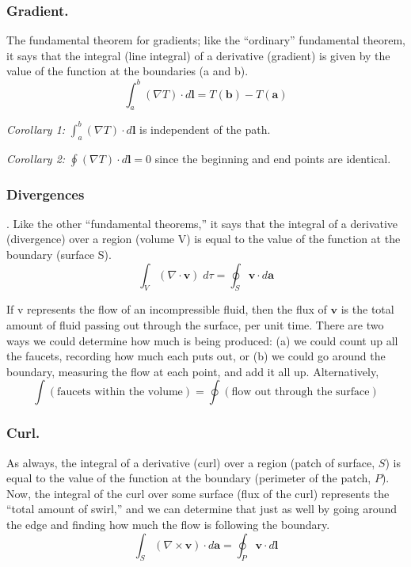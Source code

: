 \documentclass[../main.tex]{subfiles}
\begin{document}
\subsubsection{Gradient.} The fundamental theorem for gradients; like the “ordinary” fundamental theorem, it says that the integral (line integral) of a derivative (gradient) is given by the value of the function at the boundaries (a and b).
\begin{equation*}
    \int_{a}^{b}(\nabla T)\cdot d\mathbf{l}=T(\mathbf{b})-T(\mathbf{a})
\end{equation*}

\emph{Corollary 1:} $ \int_{a}^{b}(\nabla T)\cdot d\mathbf{l}$ is independent of the path.

\emph{Corollary 2:} $\oint (\nabla T)\cdot d\mathbf{l}=0 $ since the beginning and end points are identical.

\subsubsection{Divergences}.
Like the other “fundamental theorems,” it says that the integral of a derivative (divergence) over a region (volume V) is equal to the value of the function at the boundary (surface S).
\begin{equation*}
    \int_{V}(\nabla \cdot \mathbf{v})\;d\tau=\oint_{S}\mathbf{v}\cdot d\mathbf{a}
\end{equation*}

If v represents the flow of an incompressible fluid, then the flux of $\mathbf{v}$ is the total amount of fluid passing out through the surface, per unit time.  There are two ways we could determine how much is being produced: (a) we could count up all the faucets, recording how much each puts out, or (b) we could go around the boundary, measuring the ﬂow at each point, and add it all up. Alternatively,
\begin{equation*}
    \int (\text{faucets within the volume})=\oint (\text{ﬂow out through the surface})
\end{equation*}

\subsubsection{Curl.} As always, the integral of a derivative (curl) over a region (patch of surface, $S$) is equal to the value of the function at the boundary (perimeter of the patch, $P$). Now, the integral of the curl over some surface (flux of the curl) represents the “total amount of swirl,” and we can determine that just as well by going around the edge and finding how much the flow is following the boundary.
\begin{equation*}
    \int_{S}(\nabla \times \mathbf{v})\cdot d\mathbf{a}=\oint_{P}\mathbf{v}\cdot d\mathbf{l}
\end{equation*}
\end{document}

